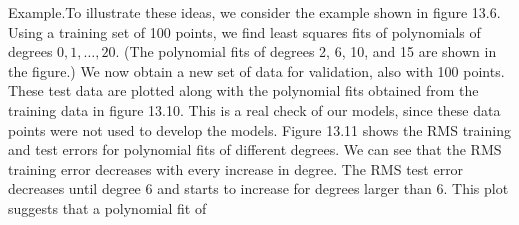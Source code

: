 
Example.To illustrate these ideas, we consider the example shown in figure 13.6. Using a training set of 100 points, we find least squares fits of polynomials of degrees \(0,1,\ldots,20\). (The polynomial fits of degrees 2, 6, 10, and 15 are shown in the figure.) We now obtain a new set of data for validation, also with 100 points. These test data are plotted along with the polynomial fits obtained from the training data in figure 13.10. This is a real check of our models, since these data points were not used to develop the models. Figure 13.11 shows the RMS training and test errors for polynomial fits of different degrees. We can see that the RMS training error decreases with every increase in degree. The RMS test error decreases until degree 6 and starts to increase for degrees larger than 6. This plot suggests that a polynomial fit of 